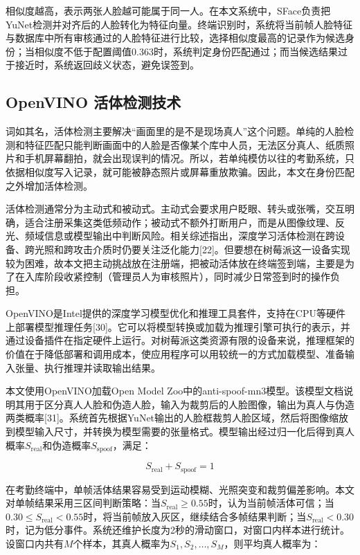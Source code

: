 \documentclass[UTF8]{heuthesis}
\begin{document}
相似度越高，表示两张人脸越可能属于同一人。在本文系统中，SFace负责把YuNet检测并对齐后的人脸转化为特征向量。终端识别时，系统将当前帧人脸特征与数据库中所有审核通过的人脸特征进行比较，选择相似度最高的记录作为候选身份；当相似度不低于配置阈值0.363时，系统判定身份匹配通过；而当候选结果过于接近时，系统返回歧义状态，避免误签到。

\subsection{OpenVINO 活体检测技术}
词如其名，活体检测主要解决“画面里的是不是现场真人”这个问题。单纯的人脸检测和特征匹配只能判断画面中的人脸是否像某个库中人员，无法区分真人、纸质照片和手机屏幕翻拍，就会出现误判的情况。所以，若单纯模仿以往的考勤系统，只依据相似度写入记录，就可能被静态照片或屏幕重放欺骗。因此，本文在身份匹配之外增加活体检测。

活体检测通常分为主动式和被动式。主动式会要求用户眨眼、转头或张嘴，交互明确，适合注册采集这类低频动作；被动式不额外打断用户，而是从图像纹理、反光、频域信息或模型输出中判断风险。相关综述指出，深度学习活体检测在跨设备、跨光照和跨攻击介质时仍要关注泛化能力[22]。但要想在树莓派这一设备实现较为困难，故本文把主动挑战放在注册端，把被动活体放在终端签到端，主要是为了在入库阶段收紧控制（管理员人为审核照片），同时减少日常签到时的操作负担。

OpenVINO是Intel提供的深度学习模型优化和推理工具套件，支持在CPU等硬件上部署模型推理任务[30]。它可以将模型转换或加载为推理引擎可执行的表示，并通过设备插件在指定硬件上运行。对树莓派这类资源有限的设备来说，推理框架的价值在于降低部署和调用成本，使应用程序可以用较统一的方式加载模型、准备输入张量、执行推理并读取输出结果。

本文使用OpenVINO加载Open Model Zoo中的anti-spoof-mn3模型。该模型文档说明其用于区分真人人脸和伪造人脸，输入为裁剪后的人脸图像，输出为真人与伪造两类概率[31]。系统首先根据YuNet输出的人脸框裁剪人脸区域，然后将图像缩放到模型输入尺寸，并转换为模型需要的张量格式。模型输出经过归一化后得到真人概率\(S_{\mathrm{real}}\)和伪造概率\(S_{\mathrm{spoof}}\)，满足：

\begin{equation*}
S_{\mathrm{real}}+S_{\mathrm{spoof}}=1\tag{2.4}
\end{equation*}

在考勤终端中，单帧活体结果容易受到运动模糊、光照突变和裁剪偏差影响。本文对单帧结果采用三区间判断策略：当\(S_{\mathrm{real}}\geq0.55\)时，认为当前帧活体可信；当\(0.30\leq S_{\mathrm{real}}<0.55\)时，将当前帧放入灰区，继续结合多帧结果判断；当\(S_{\mathrm{real}}<0.30\)时，记为低分事件。系统还维护长度为2秒的滑动窗口，对窗口内样本进行统计。设窗口内共有\(M\)个样本，其真人概率为\(S_1,S_2,\ldots,S_M\)，则平均真人概率为：
\end{document}
